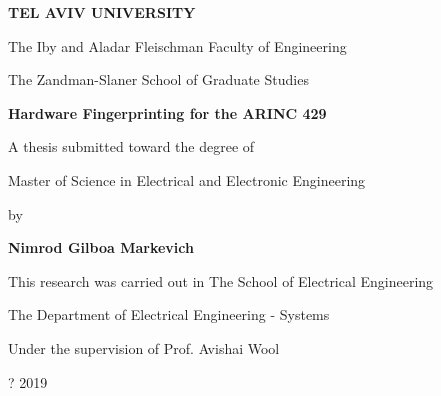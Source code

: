 \begin{titlepage}
\begin{center}
  \vspace*{1cm}
  
  \large
  \textbf{TEL AVIV UNIVERSITY}
  
  \normalsize
  The Iby and Aladar Fleischman Faculty of Engineering
  
  The Zandman-Slaner School of Graduate Studies
  
  \vspace{0.5cm}
  \Large
  \textbf{Hardware Fingerprinting for the ARINC 429}
  
  \vspace{0.5cm}
  
  \vspace{1cm}
  \normalsize
   A thesis submitted toward the degree of
   
   Master of Science in Electrical and Electronic Engineering
   
   \vspace{0.5cm}
   by
   
  \Large
  \textbf{Nimrod Gilboa Markevich}
  
  \vspace{1 cm}
  \normalsize
  This research was carried out in The School of Electrical Engineering
  
  The Department of Electrical Engineering - Systems
  
  Under the supervision of Prof. Avishai Wool
  
  \vspace{0.5cm}
  \large
  ? 2019
  
\end{center}
\end{titlepage}
